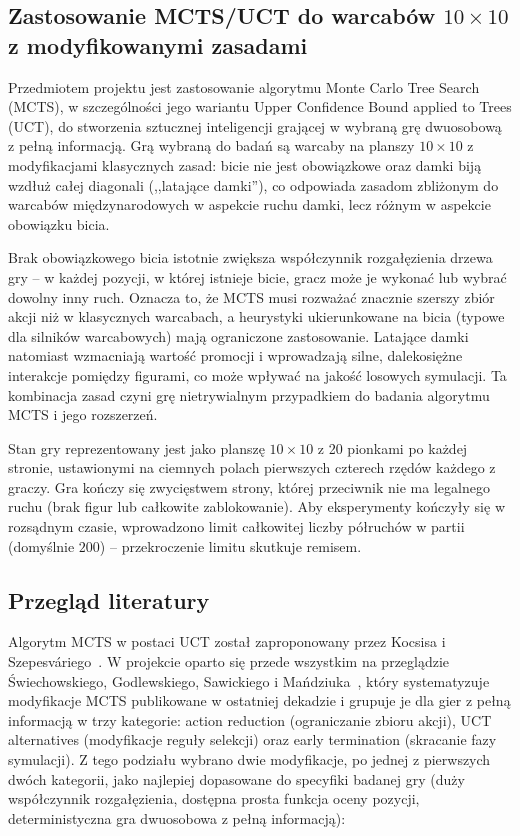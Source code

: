 \documentclass[11pt,a4paper]{article}
\begin{document}
\subsection{Zastosowanie MCTS/UCT do warcabów $10\times10$ z modyfikowanymi
zasadami}

Przedmiotem projektu jest zastosowanie algorytmu Monte Carlo Tree Search
(MCTS), w szczególności jego wariantu Upper Confidence Bound applied to
Trees (UCT), do stworzenia sztucznej inteligencji grającej w wybraną grę
dwuosobową z pełną informacją. Grą wybraną do badań są warcaby na planszy
$10\times10$ z modyfikacjami klasycznych zasad: bicie nie jest
obowiązkowe oraz damki biją wzdłuż całej diagonali (,,latające
damki''), co odpowiada zasadom zbliżonym do warcabów międzynarodowych w
aspekcie ruchu damki, lecz różnym w aspekcie obowiązku bicia.

Brak obowiązkowego bicia istotnie zwiększa współczynnik rozgałęzienia
drzewa gry -- w każdej pozycji, w której istnieje bicie, gracz może je
wykonać lub wybrać dowolny inny ruch. Oznacza to, że MCTS musi rozważać
znacznie szerszy zbiór akcji niż w klasycznych warcabach, a heurystyki
ukierunkowane na bicia (typowe dla silników warcabowych) mają ograniczone
zastosowanie. Latające damki natomiast wzmacniają wartość promocji i
wprowadzają silne, dalekosiężne interakcje pomiędzy figurami, co może
wpływać na jakość losowych symulacji. Ta kombinacja zasad czyni grę
nietrywialnym przypadkiem do badania algorytmu MCTS i jego rozszerzeń.

Stan gry reprezentowany jest jako planszę $10\times10$ z 20 pionkami po
każdej stronie, ustawionymi na ciemnych polach pierwszych czterech rzędów
każdego z graczy. Gra kończy się zwycięstwem strony, której przeciwnik nie
ma legalnego ruchu (brak figur lub całkowite zablokowanie). Aby
eksperymenty kończyły się w rozsądnym czasie, wprowadzono limit
całkowitej liczby półruchów w partii (domyślnie $200$) -- przekroczenie
limitu skutkuje remisem.

\subsection{Przegląd literatury}
\label{sec:literatura}

Algorytm MCTS w postaci UCT został zaproponowany przez Kocsisa i
Szepesváriego~\cite{kocsis2006uct}. W projekcie oparto się przede
wszystkim na przeglądzie Świechowskiego, Godlewskiego, Sawickiego i
Mańdziuka~\cite{swiechowski2023mcts}, który systematyzuje modyfikacje MCTS
publikowane w ostatniej dekadzie i grupuje je dla gier z pełną informacją w
trzy kategorie: action reduction (ograniczanie zbioru akcji),
UCT alternatives (modyfikacje reguły selekcji) oraz early
termination (skracanie fazy symulacji). Z tego podziału wybrano dwie
modyfikacje, po jednej z pierwszych dwóch kategorii, jako najlepiej
dopasowane do specyfiki badanej gry (duży współczynnik rozgałęzienia,
dostępna prosta funkcja oceny pozycji, deterministyczna gra dwuosobowa z
pełną informacją):
\end{document}
